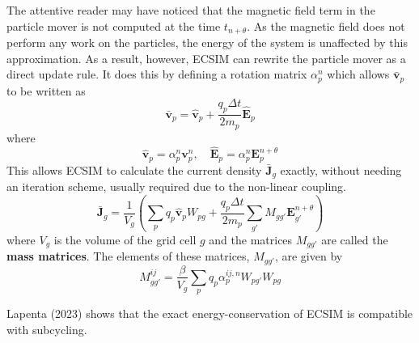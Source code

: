 The attentive reader may have noticed that the magnetic field term in the particle mover is not computed at the time $t_{n+\theta}$. As the magnetic field does not perform any work on the particles, the energy of the system is unaffected by this approximation. As a result, however, ECSIM can rewrite the particle mover as a direct update rule. It does this by defining a rotation matrix $\alpha_p^n$ which allows $\bar{\textbf{v}}_p$ to be written as
\[\bar{\textbf{v}}_p = \hat{\textbf{v}}_p + \frac{q_p \Delta t}{2 m_p}\hat{\textbf{E}}_p\]
 where 
 \[ \hat{\textbf{v}}_p = \alpha^n_p \textbf{v}_p^n, \quad \hat{\textbf{E}}_p = \alpha^n_p \textbf{E}_p^{n+\theta}
 \]
 This allows ECSIM to calculate the current density $\bar{\textbf{J}}_g$ exactly, without needing an iteration scheme, usually required due to the non-linear coupling.
 \[\bar{\textbf{J}}_g = \frac{1}{V_g}\left(\sum_p q_p \hat{\textbf{v}}_p W_{pg} + \frac{q_p \Delta t}{2 m_p}\sum_{g'}M_{g g'} \textbf{E}^{n+\theta}_{g'}\right)\]
 where $V_g$ is the volume of the grid cell $g$ and the matrices $M_{g g'}$ are called the \textbf{mass matrices}. The elements of these matrices, $M_{g g'}$, are given by
 \begin{equation}
     M_{g g'}^{ij} = \frac{\beta}{V_g}\sum_p q_p \alpha^{ij,n}_p W_{p g'} W_{p g}
 \end{equation}

 Lapenta (2023) \cite{lapenta_advances_2023} shows that the exact energy-conservation of ECSIM is compatible with subcycling.


